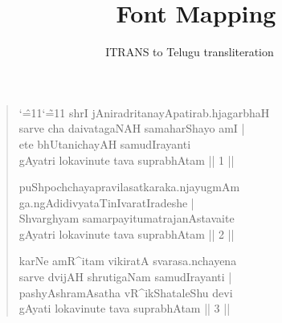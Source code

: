 \documentclass[a4paper,oneside,12pt]{article}
\title{\XeTeX\ Font Mapping}
\author{ITRANS to Telugu transliteration}
\date{\relax}
\newcommand\te{\catcode`\^=11\catcode`\~=11%
              \fontspec[Script=Telugu,Mapping=itrans-te,Scale=MatchLowercase]{Tiro Telugu}}
\begin{document}
\maketitle
\thispagestyle{empty}
\bigskip

\begin{verse}
  {\te shrI jAniradritanayApatirab.hjagarbhaH\\
    sarve cha daivatagaNAH samaharShayo amI |\\
    ete bhUtanichayAH samudIrayanti\\
    gAyatri \- lokavinute tava suprabhAtam || 1 ||

    puShpochchayapravilasatkaraka.njayugmAm\\
    ga.ngAdidivyataTinIvaratIradeshe\- |\\
    Shvarghyam samarpayitumatrajanAstavaite\\
    gAyatri \- lokavinute \- tava suprabhAtam || 2 ||

    karNe amR^itam vikiratA svarasa.nchayena\\
    sarve dvijAH shrutigaNam samudIrayanti |\\
    pashyAshramAsatha vR^ikShataleShu devi\\
    gAyati \-lokavinute \-tava suprabhAtam || 3 ||
  }
\end{verse}
\end{document}

